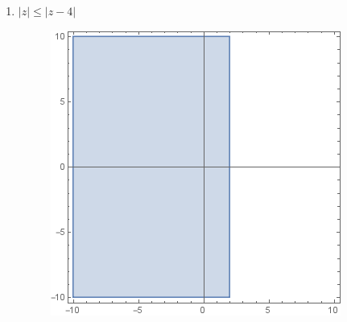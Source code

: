 \documentclass{article}
\begin{document}
\begin{enumerate}
\begin{enumerate}
		\item $|z| \leq |z-4|$
			\begin{figure}[H]
			\includegraphics[scale=0.6]{6d.png}
			\end{figure}
	\end{enumerate}
	
	
	
\end{enumerate}
\end{document}
